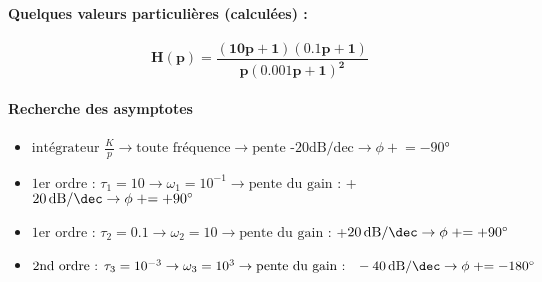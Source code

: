 \paragraph{Quelques valeurs particulières (calculées) :}
\begin{center}
\end{center}
\newpage
\question{}
\[
\boldsymbol{H(p) = \dfrac{(10p+1)(0.1p+1)}{p(0.001p+1)^2}}
\]
\paragraph{Recherche des asymptotes}
\begin{itemize}
\item $\textrm{intégrateur } \frac{K}{p}     \rightarrow 
      \textrm{toute fréquence}               \rightarrow 
      \textrm{pente -20dB/dec}               \rightarrow 
      \phi\mathrel{+}=-90\si{\degree}$
\item $\textrm{1er ordre : }\tau_1=10          \rightarrow 
      \omega_1=10^{-1}                       \rightarrow 
      \textrm{pente du gain : } 
      $+$\SI[per-mode=symbol]{20}{\dB\per\dec}    \rightarrow 
      \phi\mathrel{+}=+90\si{\degree}$ 
\item $ \textrm{1er ordre : }\tau_2=0.1        \rightarrow 
      \omega_2=10                            \rightarrow 
      \textrm{pente du gain : } 
      $+$\SI[per-mode=symbol]{20}{\dB\per\dec}     \rightarrow 
      \phi\mathrel{+}=+90\si{\degree}$ 
\item $ \textrm{2nd ordre : }\tau_3=10^{-3} \rightarrow 
      \omega_3=10^3                          \rightarrow 
      \textrm{pente du gain : } 
      \SI[per-mode=symbol]{-40}{\dB\per\dec}     \rightarrow 
      \phi\mathrel{+}=-180\si{\degree}$ 
\end{itemize}
\begin{center}
    

    
\end{center}

